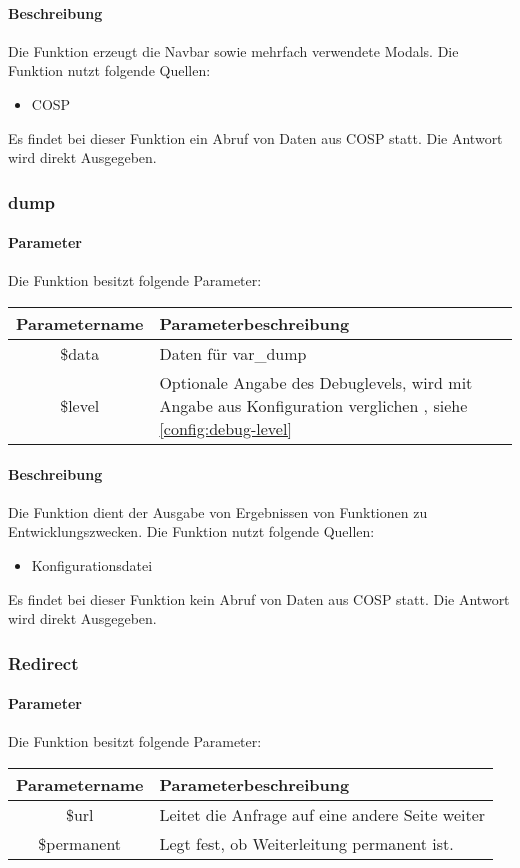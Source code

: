 \paragraph{Beschreibung} Die Funktion erzeugt die Navbar sowie mehrfach verwendete Modals. Die Funktion nutzt folgende Quellen:
\begin{itemize}
	\item COSP
\end{itemize}
Es findet bei dieser Funktion ein Abruf von Daten aus {\glqq COSP\grqq} statt. Die Antwort wird direkt Ausgegeben.
\subsubsection{dump}
\paragraph{Parameter} Die Funktion besitzt folgende Parameter:
\begin{table}[H]
	\begin{tabular}{|c|p{11cm}|}
		\hline
		\textbf{Parametername} & \textbf{Parameterbeschreibung} \\ \hline
		\$data  & Daten für var\_dump \\ \hline
		\$level & Optionale Angabe des Debuglevels, wird mit Angabe aus Konfiguration verglichen , siehe \autoref{config:debug-level} \\ \hline
	\end{tabular}
\end{table}
\paragraph{Beschreibung} Die Funktion dient der Ausgabe von Ergebnissen von Funktionen zu Entwicklungszwecken. Die Funktion nutzt folgende Quellen:
\begin{itemize}
	\item Konfigurationsdatei
\end{itemize}
Es findet bei dieser Funktion kein Abruf von Daten aus {\glqq COSP\grqq} statt. Die Antwort wird direkt Ausgegeben.
\subsubsection{Redirect}
\paragraph{Parameter} Die Funktion besitzt folgende Parameter:
\begin{table}[H]
	\begin{tabular}{|c|p{11cm}|}
		\hline
		\textbf{Parametername} & \textbf{Parameterbeschreibung} \\ \hline
		\$url       & Leitet die Anfrage auf eine andere Seite weiter \\ \hline
		\$permanent & Legt fest, ob Weiterleitung permanent ist. \\ \hline
	\end{tabular}
\end{table}
